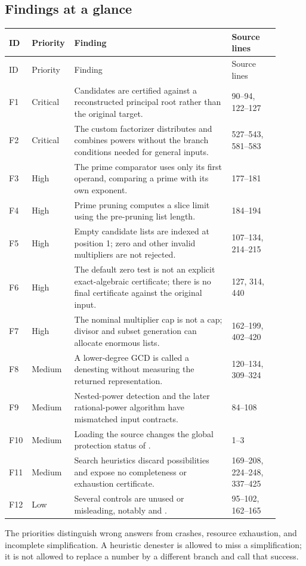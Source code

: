 \documentclass[11pt,letterpaper]{article}
\newcommand{\code}[1]{\texttt{\detokenize{#1}}}
\theoremstyle{definition}
\begin{document}
\subsection{Findings at a glance}
\small
\begin{longtable}{@{}p{0.065\linewidth}p{0.10\linewidth}p{0.56\linewidth}p{0.17\linewidth}@{}}
\toprule
ID & Priority & Finding & Source lines\\\midrule
\endfirsthead
\toprule ID & Priority & Finding & Source lines\\\midrule
\endhead
F1 & Critical & Candidates are certified against a reconstructed principal root rather than the original target. & 90--94, 122--127\\
F2 & Critical & The custom factorizer distributes and combines powers without the branch conditions needed for general inputs. & 527--543, 581--583\\
F3 & High & The prime comparator uses only its first operand, comparing a prime with its own exponent. & 177--181\\
F4 & High & Prime pruning computes a slice limit using the pre-pruning list length. & 184--194\\
F5 & High & Empty candidate lists are indexed at position 1; zero and other invalid multipliers are not rejected. & 107--134, 214--215\\
F6 & High & The default zero test is not an explicit exact-algebraic certificate; there is no final certificate against the original input. & 127, 314, 440\\
F7 & High & The nominal multiplier cap is not a cap; divisor and subset generation can allocate enormous lists. & 162--199, 402--420\\
F8 & Medium & A lower-degree GCD is called a denesting without measuring the returned representation. & 120--134, 309--324\\
F9 & Medium & Nested-power detection and the later rational-power algorithm have mismatched input contracts. & 84--108\\
F10 & Medium & Loading the source changes the global protection status of \code{Print}. & 1--3\\
F11 & Medium & Search heuristics discard possibilities and expose no completeness or exhaustion certificate. & 169--208, 224--248, 337--425\\
F12 & Low & Several controls are unused or misleading, notably \code{extrapower} and \code{maxprimes}. & 95--102, 162--165\\
\bottomrule
\end{longtable}
\normalsize
The priorities distinguish wrong answers from crashes, resource exhaustion, and
incomplete simplification. A heuristic denester is allowed to miss a simplification;
it is not allowed to replace a number by a different branch and call that success.
\end{document}
